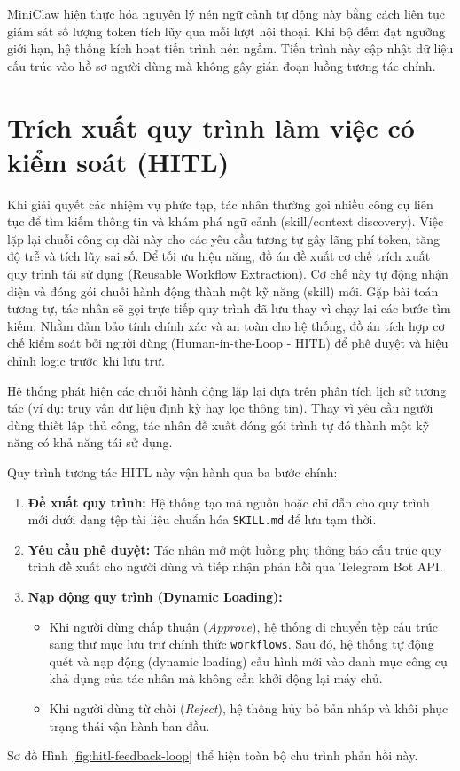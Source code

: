 MiniClaw hiện thực hóa nguyên lý nén ngữ cảnh tự động này bằng cách liên tục giám sát số lượng token tích lũy qua mỗi lượt hội thoại. Khi bộ đếm đạt ngưỡng giới hạn, hệ thống kích hoạt tiến trình nén ngầm. Tiến trình này cập nhật dữ liệu cấu trúc vào hồ sơ người dùng mà không gây gián đoạn luồng tương tác chính.

\section{Trích xuất quy trình làm việc có kiểm soát (HITL)}
Khi giải quyết các nhiệm vụ phức tạp, tác nhân thường gọi nhiều công cụ liên tục để tìm kiếm thông tin và khám phá ngữ cảnh (skill/context discovery). Việc lặp lại chuỗi công cụ dài này cho các yêu cầu tương tự gây lãng phí token, tăng độ trễ và tích lũy sai số. Để tối ưu hiệu năng, đồ án đề xuất cơ chế trích xuất quy trình tái sử dụng (Reusable Workflow Extraction). Cơ chế này tự động nhận diện và đóng gói chuỗi hành động thành một kỹ năng (skill) mới. Gặp bài toán tương tự, tác nhân sẽ gọi trực tiếp quy trình đã lưu thay vì chạy lại các bước tìm kiếm. Nhằm đảm bảo tính chính xác và an toàn cho hệ thống, đồ án tích hợp cơ chế kiểm soát bởi người dùng (Human-in-the-Loop - HITL) để phê duyệt và hiệu chỉnh logic trước khi lưu trữ.

Hệ thống phát hiện các chuỗi hành động lặp lại dựa trên phân tích lịch sử tương tác (ví dụ: truy vấn dữ liệu định kỳ hay lọc thông tin). Thay vì yêu cầu người dùng thiết lập thủ công, tác nhân đề xuất đóng gói trình tự đó thành một kỹ năng có khả năng tái sử dụng.

Quy trình tương tác HITL này vận hành qua ba bước chính:
\begin{enumerate}
  \item \textbf{Đề xuất quy trình:} Hệ thống tạo mã nguồn hoặc chỉ dẫn cho quy trình mới dưới dạng tệp tài liệu chuẩn hóa \texttt{SKILL.md} để lưu tạm thời.
  \item \textbf{Yêu cầu phê duyệt:} Tác nhân mở một luồng phụ thông báo cấu trúc quy trình đề xuất cho người dùng và tiếp nhận phản hồi qua Telegram Bot API.
  \item \textbf{Nạp động quy trình (Dynamic Loading):} 
    \begin{itemize}
      \item Khi người dùng chấp thuận (\emph{Approve}), hệ thống di chuyển tệp cấu trúc sang thư mục lưu trữ chính thức \texttt{workflows}. Sau đó, hệ thống tự động quét và nạp động (dynamic loading) cấu hình mới vào danh mục công cụ khả dụng của tác nhân mà không cần khởi động lại máy chủ.
      \item Khi người dùng từ chối (\emph{Reject}), hệ thống hủy bỏ bản nháp và khôi phục trạng thái vận hành ban đầu.
    \end{itemize}
\end{enumerate}
Sơ đồ Hình \ref{fig:hitl-feedback-loop} thể hiện toàn bộ chu trình phản hồi này.

